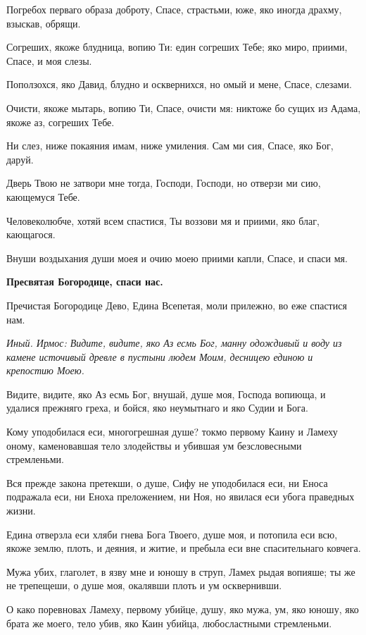 Погребох перваго образа доброту, Спасе, страстьми, юже, яко иногда драхму, взыскав, обрящи.


Согреших, якоже блудница, вопию Ти: един согреших Тебе; яко миро, приими, Спасе, и моя слезы.


Поползохся, яко Давид, блудно и осквернихся, но омый и мене, Спасе, слезами.


Очисти, якоже мытарь, вопию Ти, Спасе, очисти мя: никтоже бо сущих из Адама, якоже аз, согреших Тебе.


Ни слез, ниже покаяния имам, ниже умиления. Сам ми сия, Спасе, яко Бог, даруй.


Дверь Твою не затвори мне тогда, Господи, Господи, но отверзи ми сию, кающемуся Тебе.


Человеколюбче, хотяй всем спастися, Ты воззови мя и приими, яко благ, кающагося.


Внуши воздыхания души моея и очию моею приими капли, Спасе, и спаси мя.


\bfseries Пресвятая Богородице, спаси нас.


\normalfont{}


Пречистая Богородице Дево, Едина Всепетая, моли прилежно, во еже спастися нам.


\itshape Иный. Ирмос\normalfont{}: Видите, видите, яко Аз есмь Бог, манну одождивый и воду из камене источивый древле в пустыни людем Моим, десницею единою и крепостию Моею.


Видите, видите, яко Аз есмь Бог, внушай, душе моя, Господа вопиюща, и удалися прежняго греха, и бойся, яко неумытнаго и яко Судии и Бога.


Кому уподобилася еси, многогрешная душе? токмо первому Каину и Ламеху оному, каменовавшая тело злодействы и убившая ум безсловесными стремленьми.


Вся прежде закона претекши, о душе, Сифу не уподобилася еси, ни Еноса подражала еси, ни Еноха преложением, ни Ноя, но явилася еси убога праведных жизни.


Едина отверзла еси хляби гнева Бога Твоего, душе моя, и потопила еси всю, якоже землю, плоть, и деяния, и житие, и пребыла еси вне спасительнаго ковчега.


Мужа убих, глаголет, в язву мне и юношу в струп, Ламех рыдая вопияше; ты же не трепещеши, о душе моя, окалявши плоть и ум осквернивши.


О како поревновах Ламеху, первому убийце, душу, яко мужа, ум, яко юношу, яко брата же моего, тело убив, яко Каин убийца, любосластными стремленьми.


